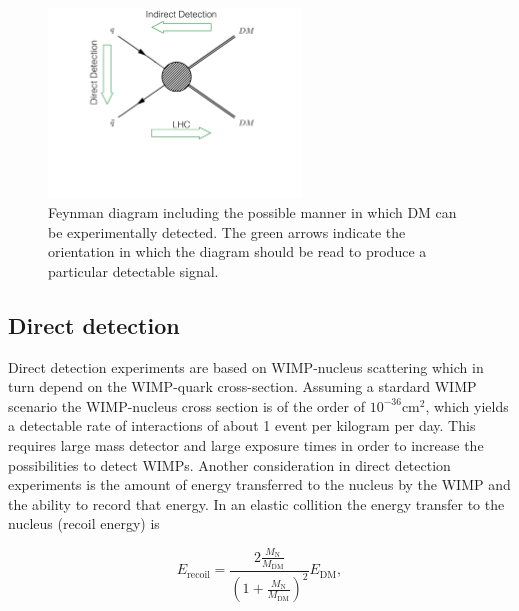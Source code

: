 \begin{figure}
 \centering
\includegraphics[width=0.6\textwidth]{IntroFigures/DiagramDMdetection.pdf}
\caption{Feynman diagram including the possible manner in which DM can
  be experimentally detected. The green arrows indicate the
  orientation in which the diagram should be read to produce a
  particular detectable signal.\label{fig:dmDetection}}
\end{figure}

\subsection{Direct detection}
Direct detection experiments are based on WIMP-nucleus scattering
which in turn depend on the WIMP-quark cross-section. Assuming a
stardard WIMP scenario the WIMP-nucleus cross section is of the order
of $10^{-36}$\unit{cm}$^{2}$, which yields a detectable rate of
interactions of about 1 event per kilogram per day. This requires
large mass detector and large exposure times in order to increase the
possibilities to detect WIMPs. Another consideration in direct
detection experiments is the amount of energy transferred to the
nucleus by the WIMP and the ability to record that energy. In an
elastic collition the energy transfer to the nucleus (recoil energy)
is

\begin{equation}
\label{eq:recoilE}
E_{\mathrm{recoil}} = \frac{2\frac{M_{\mathrm{N}}}{M_{\mathrm{DM}}}}{\left(1+\frac{M_{\mathrm{N}}}{M_{\mathrm{DM}}}\right)^{2}}E_{\mathrm{DM}},
\end{equation}

